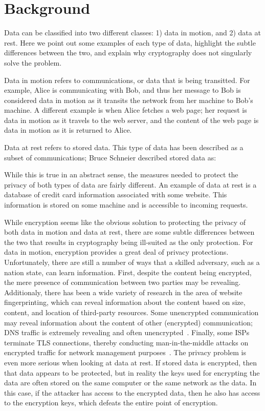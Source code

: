 \section{Background}
\label{sec:background}

Data can be classified into two different classes: 1) data in motion, and 2) data at rest.  Here we point out some examples of each type of data, highlight the subtle differences between the two, and explain why cryptography does not singularly solve the problem.

Data in motion refers to communications, or data that is being transitted.  For example, Alice is communicating with Bob, and thus her message to Bob is considered data in motion as it transits the network from her machine to Bob's machine.  A different example is when Alice fetches a web page; her request is data in motion as it travels to the web server, and the content of the web page is data in motion as it is returned to Alice.

Data at rest refers to stored data. This type of data has been described as a subset of communications; Bruce Schneier described stored data as: 


While this is true in an abstract sense, the measures needed to protect the privacy of both types of data are fairly different.  An example of data at rest is a database of credit card information associated with some website.  This information is stored on some machine and is accessible to incoming requests.  

While encryption seems like the obvious solution to protecting the privacy of both data in motion and data at rest, there are some subtle differences between the two that results in cryptography being ill-suited as the only protection.  For data in motion, encryption provides a great deal of privacy protections.  Unfortunately, there are still a number of ways that a skilled adversary, such as a nation state, can learn information.  First, despite the content being encrypted, the mere presence of communication between two parties may be revealing.  Additionaly, there has been a wide variety of research in the area of website fingerprinting, which can reveal information about the content based on size, content, and location of third-party resources.  Some unencrypted communication may reveal information about the content of other (encrypted) communication; DNS traffic is extremely revealing and often unencrypted~\cite{isps_see}.  Finally, some ISPs terminate TLS connections, thereby conducting man-in-the-middle attacks on encrypted traffic for network management purposes~\cite{gogo}.  The privacy problem is even more serious when looking at data at rest.  If stored data is encrypted, then that data appears to be protected, but in reality the keys used for encrypting the data are often stored on the same computer or the same network as the data.  In this case, if the attacker has access to the encrypted data, then he also has access to the encryption keys, which defeats the entire point of encryption.  

